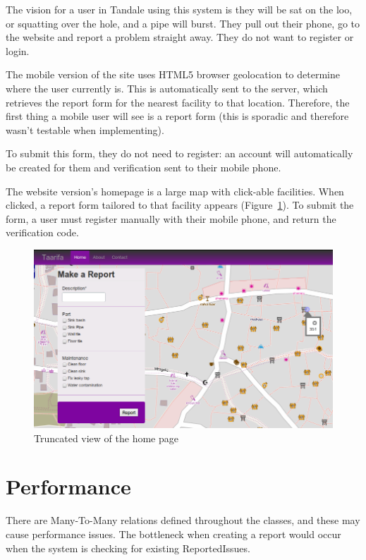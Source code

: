 The vision for a user in Tandale using this system is they will be sat on the loo, or squatting over the hole, and a pipe will burst. They pull out their phone, go to the website and report a problem straight away. They do not want to register or login.

The mobile version of the site uses HTML5 browser geolocation to determine where the user currently is. This is automatically sent to the server, which retrieves the report form for the nearest facility to that location. Therefore, the first thing a mobile user will see is a report form (this is sporadic and therefore wasn't testable when implementing).

To submit this form, they do not need to register: an account will automatically be created for them and verification sent to their mobile phone.

The website version's homepage is a large map with click-able facilities. When clicked, a report form tailored to that facility appears (Figure~\ref{fig:rm:fac:home}). To submit the form, a user must register manually with their mobile phone, and return the verification code.

\begin{figure}
\centering
\includegraphics[scale=0.4]{img/home.png}
\caption{Truncated view of the home page}
\label{fig:rm:fac:home}
\end{figure}

\FloatBarrier
\section{Performance}
\label{sec:rm:fac:perf}

There are Many-To-Many relations defined throughout the classes, and these may cause performance issues. The bottleneck when creating a report would occur when the system is checking for existing ReportedIssues.

